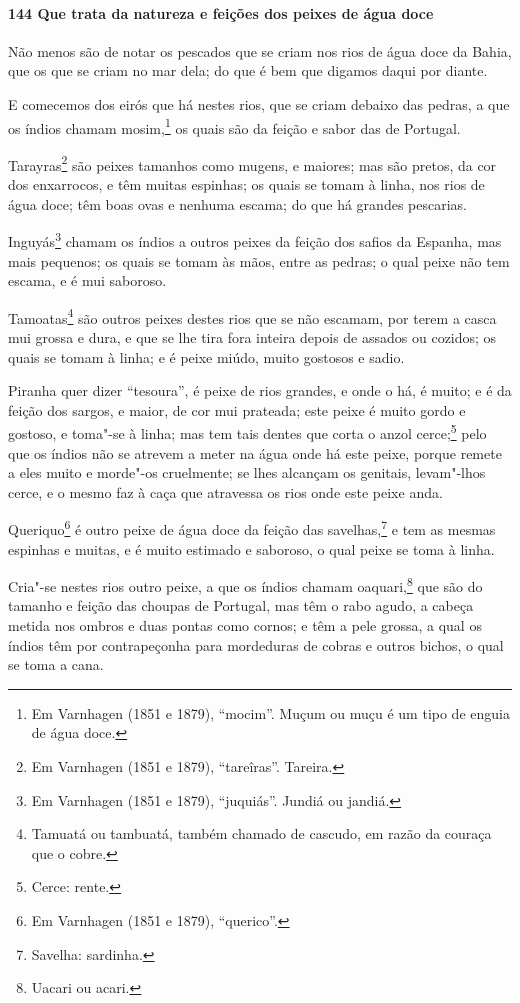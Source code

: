 \paragraph{144 Que trata da natureza e feições dos peixes de água doce}

Não menos são de notar os pescados que se criam nos rios de água doce da Bahia, que os que
se criam no mar dela; do que é bem que digamos daqui por diante.

E comecemos dos eirós que há nestes rios, que se criam debaixo das pedras, a que os índios
chamam mosim,\footnote{ Em Varnhagen (1851 e 1879), ``mocim''. Muçum ou muçu é um tipo de
enguia de água doce.} os quais são da feição e sabor das de Portugal.

Tarayras\footnote{ Em Varnhagen (1851 e 1879), ``tareîras''. Tareira.} são peixes tamanhos
como mugens, e maiores; mas são pretos, da cor dos enxarrocos, e têm muitas espinhas; os
quais se tomam à linha, nos rios de água doce; têm boas ovas e nenhuma escama; do que há
grandes pescarias.

Inguyás\footnote{ Em Varnhagen (1851 e 1879), ``juquiás''. Jundiá ou jandiá.} chamam os
índios a outros peixes da feição dos safios da Espanha, mas mais pequenos; os quais se
tomam às mãos, entre as pedras; o qual peixe não tem escama, e é mui saboroso.

Tamoatas\footnote{ Tamuatá ou tambuatá, também chamado de cascudo, em razão da couraça que
o cobre.} são outros peixes destes rios que se não escamam, por terem a casca mui grossa e
dura, e que se lhe tira fora inteira depois de assados ou cozidos; os quais se tomam à
linha; e é peixe miúdo, muito gostosos e sadio.

Piranha quer dizer ``tesoura'', é peixe de rios grandes, e onde o há, é muito; e é da
feição dos sargos, e maior, de cor mui prateada; este peixe é muito gordo e gostoso, e
toma"-se à linha; mas tem tais dentes que corta o anzol cerce;\footnote{ Cerce: rente.}
pelo que os índios não se atrevem a meter na água onde há este peixe, porque remete a eles
muito e morde"-os cruelmente; se lhes alcançam os genitais, levam"-lhos cerce, e o mesmo faz
à caça que atravessa os rios onde este peixe anda.

Queriquo\footnote{ Em Varnhagen (1851 e 1879), ``querico''.} é outro peixe de água doce da
feição das savelhas,\footnote{ Savelha: sardinha.} e tem as mesmas espinhas e muitas, e é
muito estimado e saboroso, o qual peixe se toma à linha.

Cria"-se nestes rios outro peixe, a que os índios chamam oaquari,\footnote{ Uacari ou
acari.} que são do tamanho e feição das choupas de Portugal, mas têm o rabo agudo, a
cabeça metida nos ombros e duas pontas como cornos; e têm a pele grossa, a qual os índios
têm por contrapeçonha para mordeduras de cobras e outros bichos, o qual se toma a cana.

